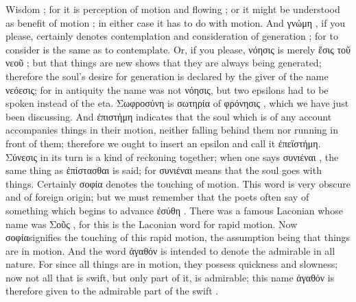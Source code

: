 {{{{Wisdom ; for it is perception  of motion  and flowing ; or it might be understood as benefit  of motion ; in either case it has to do with motion. And γνώμη , if you please, certainly denotes contemplation and consideration of generation ; for to consider is the same as to contemplate. Or, if you please, νόησις  is merely ἕσις  τοῦ νεοῦ ; but that things are new shows that they are always being generated;  therefore the soul's desire for generation is declared by the giver of the name νεόεσις; for in antiquity the name was not νόησις, but two epsilons had to be spoken instead of the eta. Σωφροσύνη  is σωτηρία  of φρόνησις , which we have just been discussing.  And ἐπιστήμη  indicates that the soul which is of any account accompanies  things in their motion, neither falling behind them nor running in front of them; therefore we ought to insert an epsilon and call it ἐπεϊστήμη. Σύνεσις  in its turn is a kind of reckoning together; when one says συνιέναι , the same thing as ἐπίστασθαι is said;  for συνιέναι means that the soul goes with things. Certainly σοφία  denotes the touching of motion. This word is very obscure and of foreign origin; but we must remember that the poets often say of something which begins to advance ἐσύθη . There was a famous Laconian whose name was Σοῦς , for this is the Laconian word for rapid motion. Now σοφίαsignifies the touching  of this rapid motion, the assumption being that things are in motion. And the word ἀγαθόν   is intended to denote the admirable  in all nature. For since all things are in motion, they possess quickness and slowness; now not all that is swift, but only part of it, is admirable; this name ἀγαθόν is therefore given to the admirable  part of the swift .

}}}}
